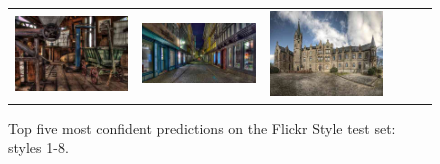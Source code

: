 \begin{figure}
\begin{minipage}[t]{\textwidth}
\begin{tabular}{m{.01\linewidth} m{.16\linewidth} m{.16\linewidth} m{.16\linewidth} m{.16\linewidth} m{.16\linewidth}}
    \includegraphics[width=\linewidth]{../style/figures/flickr_on_flickr/pred_style_HDR/2.jpg} &
    \includegraphics[width=\linewidth]{../style/figures/flickr_on_flickr/pred_style_HDR/3.jpg} &
    \includegraphics[width=\linewidth]{../style/figures/flickr_on_flickr/pred_style_HDR/4.jpg}
\end{tabular}
\end{minipage}
\caption{
    Top five most confident predictions on the Flickr Style test set: styles 1-8.
}\label{fig:flickr_on_flickr1}
\end{figure}
